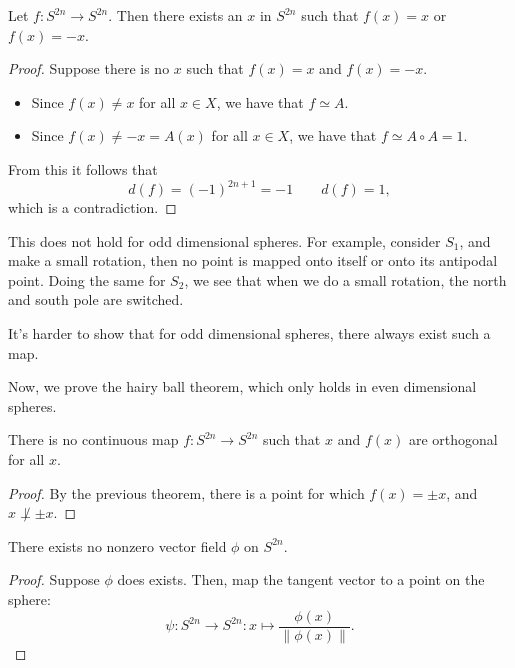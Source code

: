 \begin{theorem}
    Let $f: S^{2n} \to S^{2n}$.
    Then there exists an $x$ in  $S^{2n}$ such that $f(x) = x$ or  $f(x) = -x$.
\end{theorem}
\begin{proof}
    Suppose there is no $x$ such that $f(x) = x$ and $f(x) = -x$.

    \begin{itemize}
        \item Since  $f(x) \neq x$ for all  $x \in X$, we have that $f \simeq A$.
        \item Since  $f(x) \neq -x = A(x)$ for all  $x \in X$, we have that $f \simeq A  \circ A = 1$.
    \end{itemize}
   From this it follows that
   \[
       d(f) = (-1)^{2n + 1} = -1 \qquad 
    d(f) = 1
   ,\] 
   which is a contradiction.
\end{proof}
\begin{remark}
    This does not hold for odd dimensional spheres.
    For example, consider $S_1$, and make a small rotation, then no point is mapped onto itself or onto its antipodal point.
    Doing the same for $S_2$, we see that when we do a small rotation, the north and south pole are switched.
\end{remark}
\begin{remark}
    It's harder to show that for odd dimensional spheres, there always exist such a map.
\end{remark}

Now, we prove the hairy ball theorem, which only holds in even dimensional spheres.

\begin{corollary}
    There is no continuous map $f: S^{2n}\to S^{2n}$ such that $x$ and $f(x)$ are orthogonal for all $x$.
\end{corollary}
\begin{proof}
    By the previous theorem, there is a point for which $f(x) = \pm x$, and  $x \not \perp \pm x$.
\end{proof}
\begin{corollary}
    There exists no nonzero vector field $\phi$ on $S^{2n}$.
\end{corollary}
\begin{proof}
    Suppose $\phi$ does exists.
    Then, map the tangent vector to a point on the sphere:
    \[
        \psi: S^{2n} \to  S^{2n} : x \mapsto \frac{\phi(x)}{\|\phi(x)\|}
    .\] 
\end{proof}

